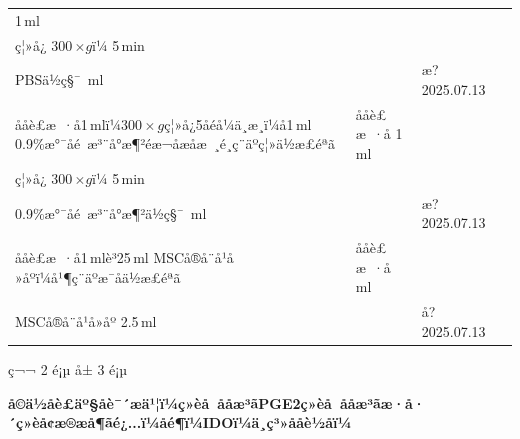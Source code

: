 \documentclass[UTF8,10pt,a4paper,fontset=fandol]{ctexart}
\newcommand{\fieldvalue}[1]{#1}
\newcommand{\handwritten}[1]{#1}
\begin{document}
\begin{tabularx}{\textwidth}{|p{}|X|p{}|p{}|}
\fieldvalue{\handwritten{1}}\,ml\\
ç¦»å¿
\fieldvalue{\handwritten{300}}\,$\times g$ï¼
\fieldvalue{\handwritten{5}}\,min\\
PBSä½ç§¯
\underline{\hspace{1.2cm}}\,ml &
\multicolumn{1}{l|}{} &
\fieldvalue{\handwritten{æ?\,2025.07.13}} \\
\hline
ååè£æ ·å1\,mlï¼$300\times g$ç¦»å¿5åéå¼ä¸æ¸ï¼å1\,ml 0.9\%æ°¯åé æ³¨å°æ¶²éæ¬åæåæ ¸é¸ç¨äºç¦»ä½æ£éªã &
ååè£æ ·å
\fieldvalue{\handwritten{1}}\,ml\\
ç¦»å¿
\fieldvalue{\handwritten{300}}\,$\times g$ï¼
\fieldvalue{\handwritten{5}}\,min\\
0.9\%æ°¯åé æ³¨å°æ¶²ä½ç§¯
\underline{\hspace{1.2cm}}\,ml &
\multicolumn{1}{l|}{} &
\fieldvalue{\handwritten{æ?\,2025.07.13}} \\
\hline
ååè£æ ·å1\,mlè³25\,ml MSCå®å¨å¹å»åºï¼å¹¶ç¨äºæ¯åä½æ£éªã &
ååè£æ ·å
\underline{\hspace{1.2cm}}\,ml\\
MSCå®å¨å¹å»åº
\fieldvalue{\handwritten{2.5}}\,ml &
\multicolumn{1}{l|}{} &
\fieldvalue{\handwritten{å?\,2025.07.13}} \\
\hline
\end{tabularx}

\vfill
\begin{center}
ç¬¬ 2 é¡µ å± 3 é¡µ
\end{center}

\newpage

\begin{center}
\textbf{å©ä½åè£äº§åè¯´æä¹¦ï¼ç»èå å­åæ³ãPGE2ç»èå å­åæ³ãæ·å·´ç»èå¢æ®æå¶ãé¿...ï¼åé¶ï¼IDOï¼ä¸ç³»ååè½åï¼}
\end{center}
\end{document}
